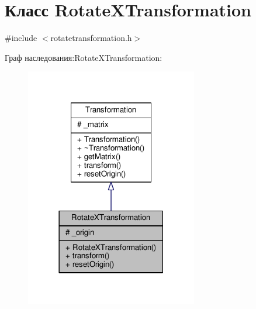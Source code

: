 \hypertarget{class_rotate_x_transformation}{}\section{Класс Rotate\+X\+Transformation}
\label{class_rotate_x_transformation}


{\ttfamily \#include $<$rotatetransformation.\+h$>$}



Граф наследования\+:Rotate\+X\+Transformation\+:
\nopagebreak
\begin{figure}[H]
\begin{center}
\leavevmode
\includegraphics[width=213pt]{da/d19/class_rotate_x_transformation__inherit__graph}
\end{center}
\end{figure}


